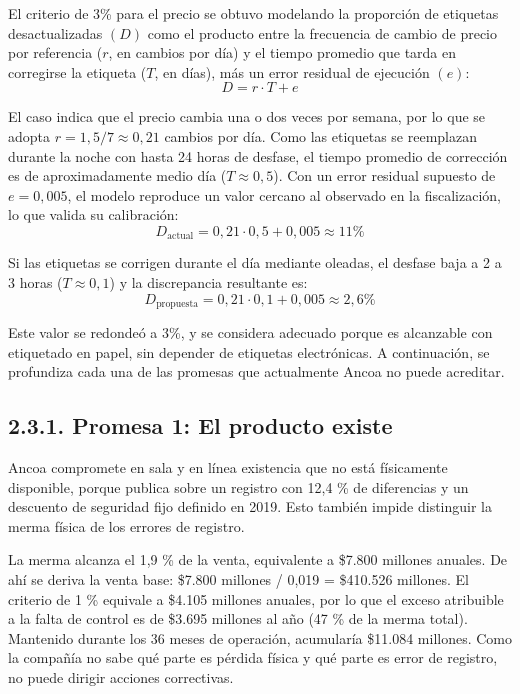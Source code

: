\documentclass[11pt]{article}
\begin{document}
El criterio de 3\% para el precio se obtuvo modelando la proporción de etiquetas desactualizadas $(D)$ como el producto entre la frecuencia de cambio de precio por referencia ($r$, en cambios por día) y el tiempo promedio que tarda en corregirse la etiqueta ($T$, en días), más un error residual de ejecución $(e)$:
\[
D = r \cdot T + e
\]

El caso indica que el precio cambia una o dos veces por semana, por lo que se adopta $r = 1{,}5/7 \approx 0{,}21$ cambios por día. Como las etiquetas se reemplazan durante la noche con hasta 24 horas de desfase, el tiempo promedio de corrección es de aproximadamente medio día ($T \approx 0{,}5$). Con un error residual supuesto de $e = 0{,}005$, el modelo reproduce un valor cercano al observado en la fiscalización, lo que valida su calibración:
\[
D_{\text{actual}} = 0{,}21 \cdot 0{,}5 + 0{,}005 \approx 11\%
\]

Si las etiquetas se corrigen durante el día mediante oleadas, el desfase baja a 2 a 3 horas ($T \approx 0{,}1$) y la discrepancia resultante es:
\[
D_{\text{propuesta}} = 0{,}21 \cdot 0{,}1 + 0{,}005 \approx 2{,}6\%
\]

Este valor se redondeó a 3\%, y se considera adecuado porque es alcanzable con etiquetado en papel, sin depender de etiquetas electrónicas. A continuación, se profundiza cada una de las promesas que actualmente Ancoa no puede acreditar.

\subsection{2.3.1. Promesa 1: El producto existe}\label{promesa-1-el-producto-existe}

Ancoa compromete en sala y en línea existencia que no está físicamente disponible, porque publica sobre un registro con 12,4 \% de diferencias y un descuento de seguridad fijo definido en 2019. Esto también impide distinguir la merma física de los errores de registro.

La merma alcanza el 1,9 \% de la venta, equivalente a \$7.800 millones anuales. De ahí se deriva la venta base: \$7.800 millones / 0,019 = \$410.526 millones. El criterio de 1 \% equivale a \$4.105 millones anuales, por lo que el exceso atribuible a la falta de control es de \$3.695 millones al año (47 \% de la merma total). Mantenido durante los 36 meses de operación, acumularía \$11.084 millones. Como la compañía no sabe qué parte es pérdida física y qué parte es error de registro, no puede dirigir acciones correctivas.
\end{document}
